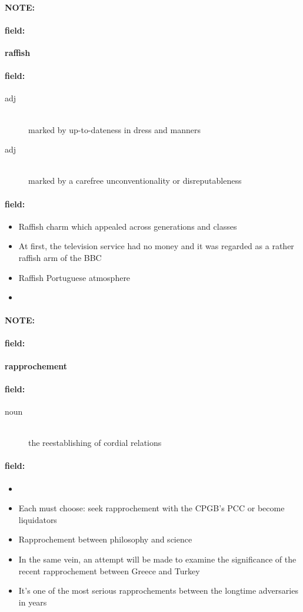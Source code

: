 \documentclass[12pt]{article}
\newenvironment{note}{\paragraph{NOTE:}}{}
\newenvironment{field}{\paragraph{field:}}{}
\begin{document}
\begin{note}
\begin{field}
\textbf{\large raffish}
\end{field}


\begin{field}
\begin{description}
\item[adj] \hfill \\ 
marked by up-to-dateness in dress and manners

\item[adj] \hfill \\ 
marked by a carefree unconventionality or disreputableness

\end{description}
\end{field}

\begin{field}
\begin{itemize}
\item Raffish charm which appealed across generations and classes
\item At first, the television service had no money and it was regarded as a rather raffish arm of the BBC
\item Raffish Portuguese atmosphere
\item 
\end{itemize}
\end{field}
\end{note}
\begin{note}
\begin{field}
\textbf{\large rapprochement}
\end{field}


\begin{field}
\begin{description}
\item[noun] \hfill \\ 
the reestablishing of cordial relations

\end{description}
\end{field}

\begin{field}
\begin{itemize}
\item 
\item Each must choose: seek rapprochement with the CPGB's PCC or become liquidators
\item Rapprochement between philosophy and science
\item In the same vein, an attempt will be made to examine the significance of the recent rapprochement between Greece and Turkey
\item It's one of the most serious rapprochements between the longtime adversaries in years
\end{itemize}
\end{field}
\end{note}
\end{document}
